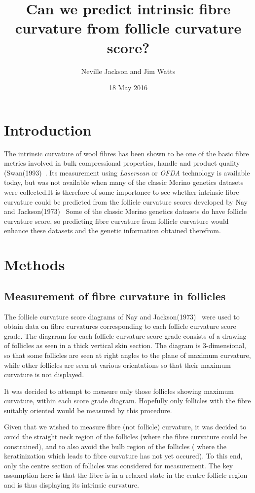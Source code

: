 \documentclass[titlepage]{article}  %
\title{ Can we predict intrinsic fibre curvature from follicle curvature score?}
\author{Neville Jackson and Jim Watts}
\date{18 May 2016}
\begin{document}
 
 
\maketitle      
\tableofcontents

\clearpage
\section{Introduction} 
The intrinsic curvature of wool fibres has been shown to  be one of the basic fibre metrics involved in bulk compressional properties, handle and product quality (Swan(1993)~\cite{swan:93}. Its measurement using {\em Laserscan} or {\em OFDA} technology is available today, but was not available when many of the classic Merino genetics datasets were collected.It is therefore of some importance to see whether intrinsic fibre curvature could be predicted from the follicle curvature scores developed by Nay and Jackson(1973)~\cite{nayj:73} Some of the classic Merino genetics datasets do have follicle curvature score, so predicting fibre curvature from follicle curvature would enhance these datasets and the genetic information obtained therefrom.


\section{Methods}
\subsection{Measurement of fibre curvature in follicles}
 The follicle curvature score diagrams of Nay and Jackson(1973)~\cite{nayj:73} were used to obtain data on fibre curvatures corresponding to each follicle curvature score grade.  The diagrram for each follicle curvature score grade consists of a drawing of follicles as seen in a thick vertical skin section.  The diagram is 3-dimensional, so that some follicles are seen at right angles to the plane of maximum curvature, while other follicles are seen at various orientations so that their maximum curvature is not displayed. 

It was decided to attempt to measure only those follicles showing maximum curvature, within each score grade diagram. Hopefully only follicles with the fibre suitably oriented would be measured by this procedure.

 Given that we wished to measure fibre (not follicle) curvature, it was decided to avoid the straight neck region of the follicles (where the fibre curvature could be constrained), and to also avoid the bulb region of the follicles ( where the keratinization which leads to fibre curvature has not yet occured). To this end, only the centre section of follicles was considered for measurement. The key assumption here is that the fibre is in a relaxed state in the centre follicle region and is thus displaying its intrinsic curvature.
\end{document}
